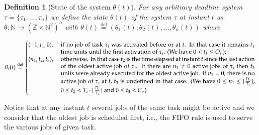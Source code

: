 \documentclass[a4paper,11pt]{article}
\newtheorem{Definition}{Definition}
\newcommand{\equals}{\stackrel{\mathrm{def}}{=}}
\begin{document}
\begin{Definition} [State of the system $\theta(t)$] \label{defState}
  For any arbitrary deadline system $\tau = \{ \tau_1, \ldots,
  \tau_n \}$ we define the {\em state} $\theta(t)$ of the system $\tau
  $ at instant $t$ as $\theta : \mathbb{N} \rightarrow (\mathbb{Z} \times\mathbb{N}^2)^n$ with $ \theta(t) \equals (\theta_1(t), \theta_2(t), \ldots, \theta_n(t))$ where
  
$$ \theta_i(t) \equals 
\begin{cases}
  (-1,t_1,0), & \text{
\begin{minipage}[t]{11.4cm}
  if no job of task $\tau_i$ was activated before or at
$t$. In that case it remains $t_1$ time units until the first activation of $\tau_i$. (We
  have $0< t_1 \leq O_i$.);
\end{minipage}
}\\

(n_1, t_2, t_3), & \text{
\begin{minipage}[t]{11.4cm}
otherwise. In that case 
$t_2$ is the time elapsed at
    instant $t$ since the last action of the oldest active job of
    $\tau_i$. If there are $n_1 \neq 0$ active jobs of $\tau_i$ then
    $t_3$ units were already executed for the oldest active job. If $n_{1} = 0$, 
    there is no active job of $\tau_i$ at $t$, $t_{3}$ is undefined in that case. (We
    have $0 \leq n_1 \leq \lceil \frac{D_i}{T_i} \rceil $, $0 \leq t_2
    < T_i\cdot \lceil \frac{D_i}{T_i} \rceil$ and $0 \leq t_3 < C_i$.)
\end{minipage}
}
\end{cases}$$
\end{Definition}
Notice that at any instant $t$ several jobs of the same task might be
active and we consider that the oldest job is scheduled first,
i.e., the FIFO rule is used to serve the various jobs of
given task. 
\end{document}
